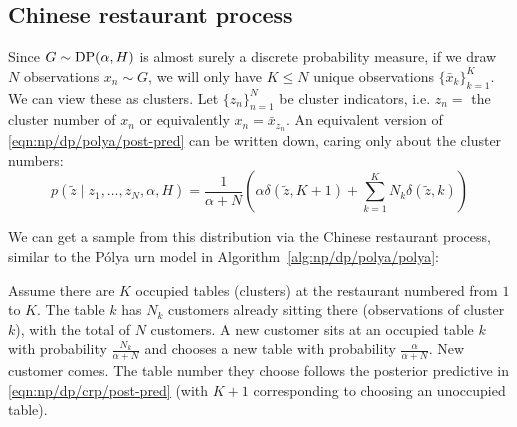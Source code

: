 \subsection{Chinese restaurant process}
Since $G \sim \operatorname{DP}(\alpha, H)$ is almost surely a discrete probability measure, if we draw $N$ observations $x_n \sim G$, we will only have $K \leq N$ unique observations $\{\bar x_k\}_{k = 1}^K$. We can view these as clusters. Let $\{z_n\}_{n = 1}^N$ be cluster indicators, i.e. $z_n = $ the cluster number of $x_n$ or equivalently $x_n = \bar x_{z_n}$. An equivalent version of \eqref{eqn:np/dp/polya/post-pred} can be written down, caring only about the cluster numbers:
\begin{equation}
	p(\tilde z \mid z_1, \dotsc, z_N, \alpha, H) = \frac{1}{\alpha + N} \left(\alpha \delta(\tilde z, K + 1) + \sum_{k = 1}^K N_k \delta(\tilde z, k)\right) \label{eqn:np/dp/crp/post-pred}
\end{equation}

We can get a sample from this distribution via the Chinese restaurant process, similar to the Pólya urn model in Algorithm~\ref{alg:np/dp/polya/polya}:
	\begin{algorithmbis}\label{alg:np/dp/crp/crp}
        \begin{algorithmic}[1]
            \State Assume there are $K$ occupied tables (clusters) at the restaurant numbered from $1$ to $K$. The table $k$ has $N_k$ customers already sitting there (observations of cluster $k$), with the total of $N$ customers. A new customer sits at an occupied table $k$ with probability $\frac{N_k}{\alpha + N}$ and chooses a new table with probability $\frac{\alpha}{\alpha + N}$.
            \State New customer comes.
            \State The table number they choose follows the posterior predictive in \eqref{eqn:np/dp/crp/post-pred} (with $K + 1$ corresponding to choosing an unoccupied table).
        \end{algorithmic}
    \end{algorithmbis}

